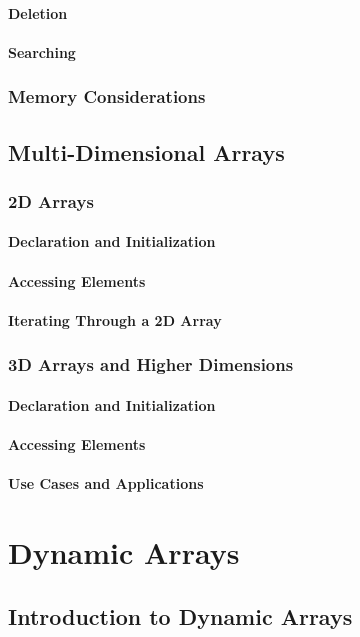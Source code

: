 \documentclass[12pt, oneside]{book}
\begin{document}
	\subsubsection{Deletion}
	\subsubsection{Searching}
	\subsection{Memory Considerations}
	\section{Multi-Dimensional Arrays}
	\subsection{2D Arrays}
	\subsubsection{Declaration and Initialization}
	\subsubsection{Accessing Elements}
	\subsubsection{Iterating Through a 2D Array}
	\subsection{3D Arrays and Higher Dimensions}
	\subsubsection{Declaration and Initialization}
	\subsubsection{Accessing Elements}
	\subsubsection{Use Cases and Applications}
	\chapter{Dynamic Arrays}
	\section{Introduction to Dynamic Arrays}
\end{document}
